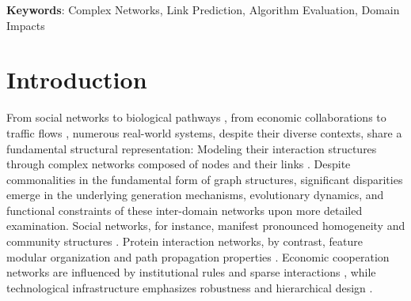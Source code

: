 \documentclass{article}
\begin{document}
\vspace {2.5mm}
{\bf Keywords}: Complex Networks, Link Prediction, Algorithm Evaluation, Domain Impacts \par


\section{Introduction}
From social networks \cite{freeman2004, vega2007, malley2008} to biological pathways \cite{barabasi2004, gosak2018}, from economic collaborations \cite{foster2005} to traffic flows \cite{cascetta2009}, numerous real-world systems, despite their diverse contexts, share a fundamental structural representation: Modeling their interaction structures through complex networks composed of nodes and their links \cite{holling2001, mitchell2009, chen2015, barabasi2016, newman2018, xu2025}. Despite commonalities in the fundamental form of graph structures, significant disparities emerge in the underlying generation mechanisms, evolutionary dynamics, and functional constraints of these inter-domain networks upon more detailed examination. Social networks, for instance, manifest pronounced homogeneity and community structures \cite{granovetter1973, newman2003}. Protein interaction networks, by contrast, feature modular organization and path propagation properties \cite{jeong2000, jeong2001}. Economic cooperation networks are influenced by institutional rules and sparse interactions \cite{acemoglu2015}, while technological infrastructure emphasizes robustness and hierarchical design \cite{doyle2005}.
	
\end{document}
